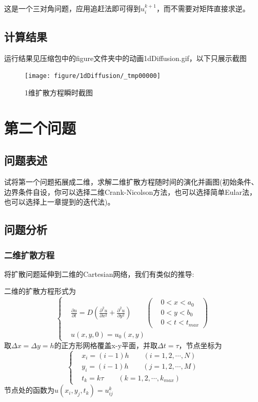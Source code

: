 \documentclass[twoside,twocolumn]{article}
\begin{document}
\begin{CJK*}{UTF8}{gkai}
这是一个三对角问题，应用追赶法即可得到$u_{i}^{k+1}$，而不需要对矩阵直接求逆。
\subsection{计算结果}
运行结果见压缩包中的figure文件夹中的动画1dDiffusion.gif，以下只展示截图
\begin{figure}[h]
	\centering
	\texttt{[image: figure/1dDiffusion/\_tmp00000]}
	\caption{1维扩散方程瞬时截图}
\end{figure}
\newpage
\section{第二个问题}
\subsection{问题表述}
试将第一个问题拓展成二维，求解二维扩散方程随时间的演化并画图(初始条件、边界条件自设，你可以选择二维Crank-Nicolson方法，也可以选择简单Eular法，也可以选择上一章提到的迭代法)。
\subsection{问题分析}
\subsubsection{二维扩散方程}
将扩散问题延伸到二维的Cartesian网络，我们有类似的推导:

二维的扩散方程形式为
\begin{equation*}
\left\{
\begin{aligned}
&\frac{\partial u}{\partial t}=D\left({\frac{\partial ^{2}u}{\partial x^{2}}}+{\frac{\partial^{2}u}{\partial y^{2}}}\right)\qquad
\left(
\begin{aligned}
&0<x<a_{0}\\&0<y<b_{0}\\&0<t<t_{max}
\end{aligned}\right)\\
&u(x,y,0)=u_{0}(x,y)
\end{aligned}\right.
\end{equation*}
取$\Delta x=\Delta y=h$的正方形网格覆盖x-y平面，并取$\Delta t=\tau$，节点坐标为
\begin{equation*}
\left\{
\begin{aligned}
&x_{i}=(i-1)h\qquad (i=1,2,\cdots ,N)\\
&y_{i}=(i-1)h\qquad (j=1,2,\cdots ,M)\\
&t_{k}=k\tau\qquad (k=1,2,\cdots ,k_{max})
\end{aligned}
\right.
\end{equation*}
节点处的函数为$u(x_{i},y_{j},t_{k})=u_{ij}^{k}$


\end{CJK*}
\end{document}

